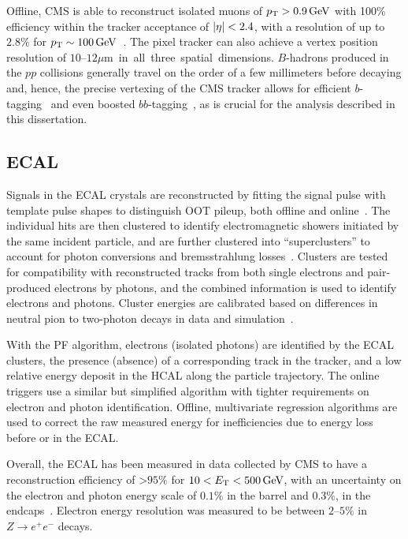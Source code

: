 Offline, CMS is able to reconstruct isolated muons of $p_{\mathrm{T}} > 0.9\,\text{Ge\hspace{-.08em}V}$ with 100\% efficiency within the tracker acceptance of $\left\lvert \eta \right\rvert < 2.4$, with a \pt resolution of up to $2.8\%$ for $p_{\mathrm{T}} \sim 100\,\text{Ge\hspace{-.08em}V}$~\cite{CMS:2014pgm}.
The pixel tracker can also achieve a vertex position resolution of $10$--$12$\unit{$\mu$m} in all three spatial dimensions.
$B$-hadrons produced in the $pp$ collisions generally travel on the order of a few millimeters before decaying and, hence, the precise vertexing of the CMS tracker allows for efficient $b$-tagging~\cite{CMS:2016kkf} and even boosted $bb$-tagging~\cite{CMS:2023tlv}, as is crucial for the analysis described in this dissertation.

\subsection{ECAL}

Signals in the ECAL crystals are reconstructed by fitting the signal pulse with template pulse shapes to distinguish OOT pileup, both offline and online~\cite{CMS:2020xlg}.
The individual hits are then clustered to identify electromagnetic showers initiated by the same incident particle, and are further clustered into ``superclusters'' to account for photon conversions and bremsstrahlung losses~\cite{CMS:2020uim}.
Clusters are tested for compatibility with reconstructed tracks from both single electrons and pair-produced electrons by photons, and the combined information is used to identify electrons and photons.
Cluster energies are calibrated based on differences in neutral pion to two-photon decays in data and simulation~\cite{CMS:2017yfk}.

With the PF algorithm, electrons (isolated photons) are identified by the ECAL clusters, the presence (absence) of a corresponding track in the tracker, and a low relative energy deposit in the HCAL along the particle trajectory.
The online triggers use a similar but simplified algorithm with tighter requirements on electron and photon identification.
Offline, multivariate regression algorithms are used to correct the raw measured energy for inefficiencies due to energy loss before or in the ECAL.

Overall, the ECAL has been measured in data collected by CMS to have a reconstruction efficiency of >$95\%$ for $10 < E_{\mathrm{T}} < 500\,\text{Ge\hspace{-.08em}V}$, with an uncertainty on the electron and photon energy scale of $0.1\%$ in the barrel and $0.3\%$, in the endcaps~\cite{CMS:2020uim}.
Electron energy resolution was measured to be between $2$--$5\%$ in $Z\to e^+e^-$ decays.

